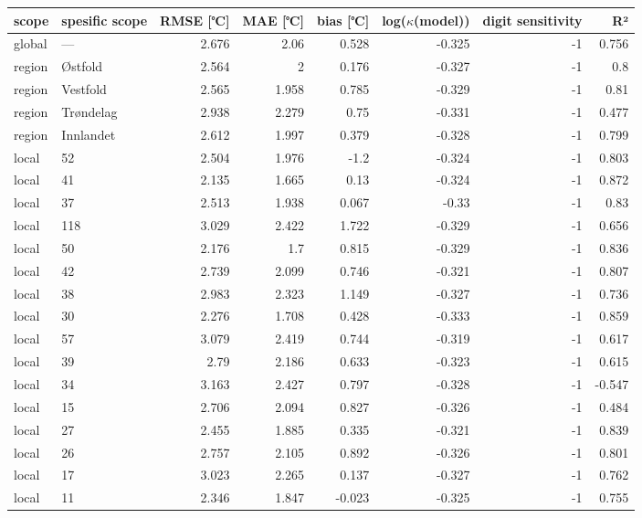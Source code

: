 \begin{tabular}{llrrrrrr}
\hline
 scope   & spesific
scope           &       RMSE
[℃] &   MAE [℃] &        bias
[℃] &   log($\kappa$(model)) &    digit
sensitivity &     R² \\
\hline
 global  & ---       & 2.676 &     2.06  &  0.528 &                 -0.325 & -1 &  0.756 \\
 region  & Østfold   & 2.564 &     2     &  0.176 &                 -0.327 & -1 &  0.8   \\
 region  & Vestfold  & 2.565 &     1.958 &  0.785 &                 -0.329 & -1 &  0.81  \\
 region  & Trøndelag & 2.938 &     2.279 &  0.75  &                 -0.331 & -1 &  0.477 \\
 region  & Innlandet & 2.612 &     1.997 &  0.379 &                 -0.328 & -1 &  0.799 \\
 local   & 52        & 2.504 &     1.976 & -1.2   &                 -0.324 & -1 &  0.803 \\
 local   & 41        & 2.135 &     1.665 &  0.13  &                 -0.324 & -1 &  0.872 \\
 local   & 37        & 2.513 &     1.938 &  0.067 &                 -0.33  & -1 &  0.83  \\
 local   & 118       & 3.029 &     2.422 &  1.722 &                 -0.329 & -1 &  0.656 \\
 local   & 50        & 2.176 &     1.7   &  0.815 &                 -0.329 & -1 &  0.836 \\
 local   & 42        & 2.739 &     2.099 &  0.746 &                 -0.321 & -1 &  0.807 \\
 local   & 38        & 2.983 &     2.323 &  1.149 &                 -0.327 & -1 &  0.736 \\
 local   & 30        & 2.276 &     1.708 &  0.428 &                 -0.333 & -1 &  0.859 \\
 local   & 57        & 3.079 &     2.419 &  0.744 &                 -0.319 & -1 &  0.617 \\
 local   & 39        & 2.79  &     2.186 &  0.633 &                 -0.323 & -1 &  0.615 \\
 local   & 34        & 3.163 &     2.427 &  0.797 &                 -0.328 & -1 & -0.547 \\
 local   & 15        & 2.706 &     2.094 &  0.827 &                 -0.326 & -1 &  0.484 \\
 local   & 27        & 2.455 &     1.885 &  0.335 &                 -0.321 & -1 &  0.839 \\
 local   & 26        & 2.757 &     2.105 &  0.892 &                 -0.326 & -1 &  0.801 \\
 local   & 17        & 3.023 &     2.265 &  0.137 &                 -0.327 & -1 &  0.762 \\
 local   & 11        & 2.346 &     1.847 & -0.023 &                 -0.325 & -1 &  0.755 \\
\hline
\end{tabular}